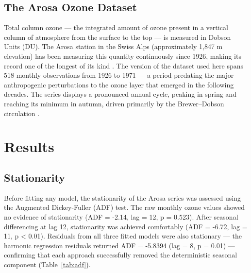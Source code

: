 \documentclass[10pt,twoside]{article}
\numberwithin{equation}{section}
\begin{document}
\subsection{The Arosa Ozone Dataset}

Total column ozone — the integrated amount of ozone present in a vertical column of atmosphere from the surface to the top — is measured in Dobson Units (DU). The Arosa station in the Swiss Alps (approximately 1,847 m elevation) has been measuring this quantity continuously since 1926, making its record one of the longest of its kind \cite{Shumway2017, Staehelin2001}. The version of the dataset used here spans 518 monthly observations from 1926 to 1971 — a period predating the major anthropogenic perturbations to the ozone layer that emerged in the following decades. The series displays a pronounced annual cycle, peaking in spring and reaching its minimum in autumn, driven primarily by the Brewer–Dobson circulation \cite{Staehelin2001}.



\section{Results}



\subsection{Stationarity}

Before fitting any model, the stationarity of the Arosa series was assessed using the Augmented Dickey-Fuller (ADF) test. The raw monthly ozone values showed no evidence of stationarity (ADF = -2.14, lag = 12, p = 0.523). After seasonal differencing at lag 12, stationarity was achieved comfortably (ADF = -6.72, lag = 11, p < 0.01). Residuals from all three fitted models were also stationary — the harmonic regression residuals returned ADF = -5.8394 (lag = 8, p = 0.01) — confirming that each approach successfully removed the deterministic seasonal component (Table~\ref{tab:adf}).
\end{document}
